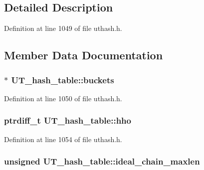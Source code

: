 \subsection{Detailed Description}


Definition at line 1049 of file uthash.\-h.



\subsection{Member Data Documentation}
\hypertarget{struct_u_t__hash__table_a8df0d350ea7376c8a844ae4c58509056}{
\subsubsection[{buckets}]{ $\ast$ U\-T\-\_\-hash\-\_\-table\-::buckets}}\label{struct_u_t__hash__table_a8df0d350ea7376c8a844ae4c58509056}


Definition at line 1050 of file uthash.\-h.

\hypertarget{struct_u_t__hash__table_afd05f4d9e45354fb010367ae9e1bddb6}{
\subsubsection[{hho}]{\setlength{\rightskip}{0pt plus 5cm}ptrdiff\-\_\-t U\-T\-\_\-hash\-\_\-table\-::hho}}\label{struct_u_t__hash__table_afd05f4d9e45354fb010367ae9e1bddb6}


Definition at line 1054 of file uthash.\-h.

\hypertarget{struct_u_t__hash__table_a5f1cec93d5d753ba02097c797e4d67ad}{
\subsubsection[{ideal\-\_\-chain\-\_\-maxlen}]{\setlength{\rightskip}{0pt plus 5cm}unsigned U\-T\-\_\-hash\-\_\-table\-::ideal\-\_\-chain\-\_\-maxlen}}\label{struct_u_t__hash__table_a5f1cec93d5d753ba02097c797e4d67ad}


